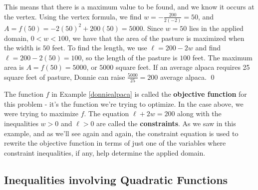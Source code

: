 \begin{ex}
\medskip

This means that there is a maximum value to be found, and we know it occurs at the vertex.  Using the vertex formula, we find $w = -\frac{200}{2(-2)} = 50$, and $A = f(50) = -2(50)^2 + 200(50) = 5000$.  Since $w=50$ lies in the applied domain, $0 < w < 100$, we have that the area of the pasture is maximized when the width is $50$ feet.  To find the length, we use $\ell = 200-2w$ and find $ \ell = 200-2(50) = 100$, so the length of the pasture is $100$ feet.  The maximum area is $A =f(50) = 5000$, or $5000$ square feet.  If an average alpaca requires 25 square feet of pasture, Donnie can raise $\frac{5000}{25} = 200$ average alpaca. \qed

\end{ex}

The function $f$ in Example \ref{donniealpaca} is called the \textbf{objective function} for this problem - it's the function we're trying to optimize.  In the case above, we were trying to maximize $f$. The equation  $\ell+2w = 200$ along with the inequalities $w>0$ and $\ell >0$ are called the \textbf{constraints}.   As we saw in this example, and as we'll see again and again, the constraint equation is used to rewrite the objective function in terms of just one of the variables where constraint inequalities, if any, help determine the applied domain.

\subsection{Inequalities involving Quadratic Functions}
\label{QuadraticInequalities}


